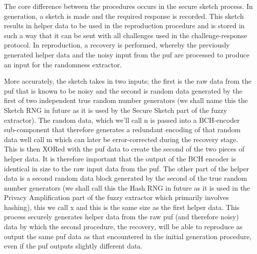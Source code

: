 The core difference between the procedures occurs in the secure sketch process.
In generation, a sketch is made and the required response is recorded. This
sketch results in helper data to be used in the reproduction procedure and is
stored in such a way that it can be sent with all challenges used in the
challenge-response protocol. In reproduction, a recovery is performed,
whereby the previously generated helper data and the noisy input from the \gls{puf}
are processed to produce an input for the randomness extractor.

More accurately, the sketch takes in two inputs; the first is the raw data
from the \gls{puf} that is known to be noisy and the second is random data generated
by the first of two independent true random number generators (we shall name
this the Sketch RNG in future as it is used by the Secure Sketch part of the
fuzzy extractor). The random data, which we'll call n is passed into a
BCH-encoder sub-component that therefore generates a redundant encoding of that
random data well call m which can later be error-corrected during the
recovery stage. This is then XORed with the \gls{puf} data to create the second of
the two pieces of helper data. It is therefore important that the output of the
BCH encoder is identical in size to the raw input data from the \gls{puf}. The other
part of the helper data is a second random data block generated by the second
of the true random number generators (we shall call this the Hash RNG in
future as it is used in the Privacy Amplification part of the fuzzy extractor
which primarily involves hashing), this we call x and this is the same size
as the first helper data. This process securely generates helper data from the
raw \gls{puf} (and therefore noisy) data by which the second procedure, the
recovery, will be able to reproduce as output the same \gls{puf} data as that
encountered in the initial generation procedure, even if the \gls{puf} outputs
slightly different data.

